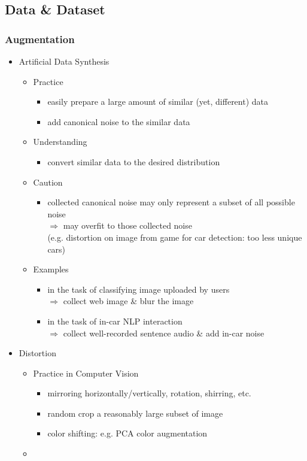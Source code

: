 \subsection{Data \& Dataset}
\subsubsection{Augmentation}
\begin{itemize}
\item Artificial Data Synthesis
	\begin{itemize}
	\item Practice
		\begin{itemize}
		\item easily prepare a large amount of similar (yet, different) data
		\item add canonical noise to the similar data
		\end{itemize}
	\item Understanding
		\begin{itemize}
		\item convert similar data to the desired distribution
		\end{itemize}
	\item Caution
		\begin{itemize}
		\item collected canonical noise may only represent a subset of all possible noise \\
		$\Rightarrow$ may overfit to those collected noise \\
		(e.g. distortion on image from game for car detection: too less unique cars)
		\end{itemize}
	\item Examples
		\begin{itemize}
		\item in the task of classifying image uploaded by users \\ 
		$\Rightarrow$ collect web image \& blur the image
		\item in the task of in-car NLP interaction \\
		$\Rightarrow$ collect well-recorded sentence audio \& add in-car noise
		\end{itemize}
	\end{itemize}
	
\item Distortion
	\begin{itemize}
	\item Practice in Computer Vision
		\begin{itemize}
		\item mirroring horizontally/vertically, rotation, shirring, etc.
		\item random crop a reasonably large subset of image
		\item color shifting: e.g. PCA color augmentation
		\end{itemize}
	\item 
	\end{itemize}
\end{itemize}
